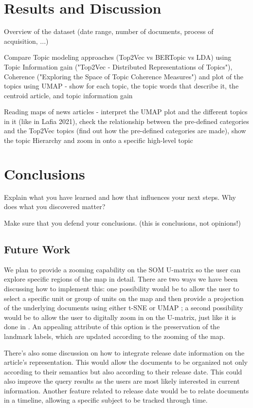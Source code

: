 \documentclass[a4paper]{article}
\begin{document}
\section* {Results and Discussion}
Overview of the dataset (date range, number of documents, process of acquisition, ...)

Compare Topic modeling approaches (Top2Vec vs BERTopic vs LDA) using Topic Information gain ("Top2Vec - Distributed Representations of Topics"), Coherence ("Exploring the Space of Topic Coherence Measures") and plot of the topics using UMAP - show for each topic, the topic words that describe it, the centroid article, and topic information gain

Reading maps of news articles - interpret the UMAP plot and the different topics in it (like in Lafia 2021), check the relationship between the pre-defined categories and the Top2Vec topics (find out how the pre-defined categories are made), show the topic Hierarchy and zoom in onto a specific high-level topic

\section*{Conclusions}
Explain what you have learned and how that influences your next steps. Why does what you discovered matter?

Make sure that you defend your conclusions. (this is conclusions, not opinions!)

\subsection*{Future Work}

We plan to provide a zooming capability on the SOM U-matrix so the user can explore specific regions of the map in detail. There are two ways we have been discussing how to implement this: one possibility would be to allow the user to select a specific unit or group of units on the map and then provide a projection of the underlying documents using either t-SNE \citep{vandermaaten2008} or UMAP \citep{mcinnes2020}; a second possibility would be to allow the user to digitally zoom in on the U-matrix, just like it is done in \citet{kaski1998}. An appealing attribute of this option is the preservation of the landmark labels, which are updated according to the zooming of the map.

There's also some discussion on how to integrate release date information on the article's representation. This would allow the documents to be organized not only according to their semantics but also according to their release date. This could also improve the query results as the users are most likely interested in current information. Another feature related to release date would be to relate documents in a timeline, allowing a specific subject to be tracked through time. 
\end{document}
